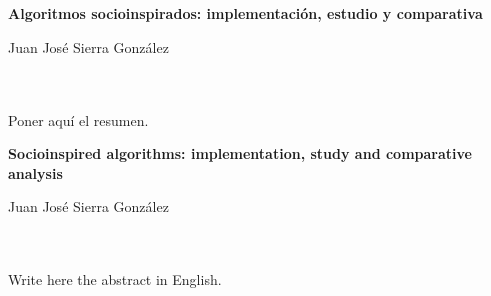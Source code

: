 \chapter*{}






\cleardoublepage
\thispagestyle{empty}

\begin{center}
{\large\bfseries Algoritmos socioinspirados: implementación, estudio y comparativa}\\
\end{center}
\begin{center}
Juan José Sierra González\\
\end{center}

\\

\vspace{0.7cm}
\\

Poner aquí el resumen.
\cleardoublepage


\thispagestyle{empty}


\begin{center}
{\large\bfseries Socioinspired algorithms: implementation, study and comparative analysis}\\
\end{center}
\begin{center}
Juan José Sierra González\\
\end{center}

\\

\vspace{0.7cm}
\\

Write here the abstract in English.

\chapter*{}
\thispagestyle{empty}

